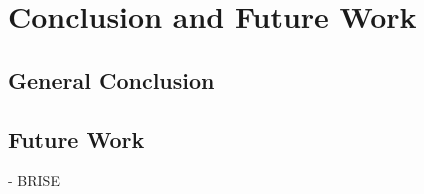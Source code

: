 \chapter{Conclusion and Future Work}
    \section{General Conclusion}
    \section{Future Work}
        - BRISE